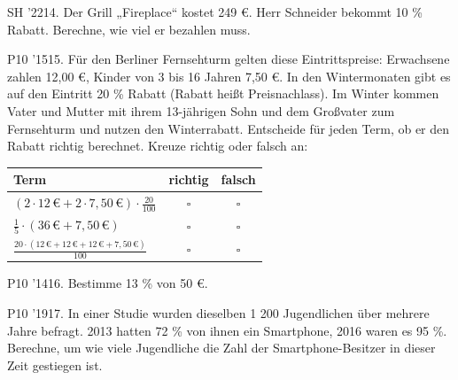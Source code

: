 \documentclass[11pt]{article}
\begin{document}
\pfgruppe{}
\begin{pfaufg}{SH ’22}{14.}{}
Der Grill „Fireplace“ kostet 249 €. Herr Schneider bekommt 10 \% Rabatt. Berechne, wie viel er bezahlen muss.
\end{pfaufg}
\pfgruppe{}
\begin{pfaufg}{P10 ’15}{15.}{}
Für den Berliner Fernsehturm gelten diese Eintrittspreise: Erwachsene zahlen 12,00 €, Kinder von 3 bis 16 Jahren 7,50 €. In den Wintermonaten gibt es auf den Eintritt 20 \% Rabatt (Rabatt heißt Preisnachlass). Im Winter kommen Vater und Mutter mit ihrem 13-jährigen Sohn und dem Großvater zum Fernsehturm und nutzen den Winterrabatt. Entscheide für jeden Term, ob er den Rabatt richtig berechnet. Kreuze richtig oder falsch an:
\par\smallskip\noindent \begingroup\renewcommand{\arraystretch}{1.5}\begin{tabular}{|l|c|c|}\hline Term & richtig & falsch\\ \hline $(2\cdot 12\,€ + 2\cdot 7{,}50\,€)\cdot\tfrac{20}{100}$ & $\square$ & $\square$ \\ $\tfrac{1}{5}\cdot(36\,€ + 7{,}50\,€)$ & $\square$ & $\square$ \\ $\tfrac{20\cdot(12\,€ + 12\,€ + 12\,€ + 7{,}50\,€)}{100}$ & $\square$ & $\square$ \\ \hline\end{tabular}\endgroup\par
{}
\end{pfaufg}
\pfgruppe{}
\begin{pfaufg}{P10 ’14}{16.}{}
Bestimme 13 \% von 50 €.
\end{pfaufg}
\pfgruppe{}
\begin{pfaufg}{P10 ’19}{17.}{}
In einer Studie wurden dieselben 1 200 Jugendlichen über mehrere Jahre befragt. 2013 hatten 72 \% von ihnen ein Smartphone, 2016 waren es 95 \%. Berechne, um wie viele Jugendliche die Zahl der Smartphone-Besitzer in dieser Zeit gestiegen ist.
\end{pfaufg}
\end{document}
